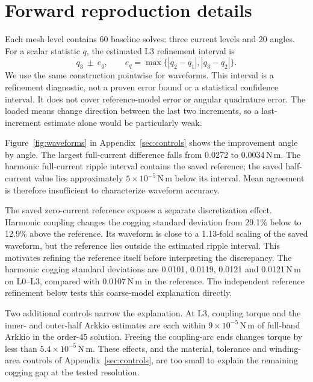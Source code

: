 \documentclass{anvil-paper}
\begin{document}
\section{Forward reproduction details}\label{sec:forward}
Each mesh
level contains 60 baseline solves: three current levels and 20 angles. For
a scalar statistic $q$, the estimated L3 refinement interval is
\begin{equation}
 q_3\ \pm\ e_q,\qquad
 e_q=\max\{|q_2-q_1|,|q_3-q_2|\}.
 \label{eq:band}
\end{equation}
We use the same construction pointwise for waveforms. This interval is a
refinement diagnostic, not a proven error bound or a statistical confidence
interval. It does not cover reference-model error or angular quadrature
error. The loaded means change direction between the last two increments,
so a last-increment estimate alone would be particularly weak.

Figure~\ref{fig:waveforms} in Appendix~\ref{sec:controls} shows the improvement angle by angle. The largest
full-current difference falls from 0.0272 to 0.0034\,N\,m. The harmonic
full-current ripple interval contains the saved reference; the saved half-current
value lies approximately $5\times10^{-5}$\,N\,m below its interval.
Mean agreement is therefore insufficient to characterize waveform accuracy.

The saved zero-current reference exposes a separate discretization effect. Harmonic coupling changes the
cogging standard deviation from 29.1\% below to 12.9\% above the reference.
Its waveform is close to a 1.13-fold scaling of the saved waveform, but the
reference lies outside the estimated ripple interval. This motivates
refining the reference itself before interpreting the discrepancy. The harmonic cogging standard deviations are
0.0101, 0.0119, 0.0121 and 0.0121\,N\,m on L0--L3, compared with
0.0107\,N\,m in the reference. The independent reference refinement below tests this coarse-model
explanation directly.

Two additional controls narrow the explanation. At L3, coupling torque
and the inner- and outer-half Arkkio estimates are each within
$9\times10^{-5}$\,N\,m of full-band Arkkio in the order-45 solution.
Freeing the coupling-arc ends changes torque by less than
$5.4\times10^{-5}$\,N\,m. These effects, and the material, tolerance and
winding-area controls of Appendix~\ref{sec:controls}, are too small to
explain the remaining cogging gap at the tested resolution.
\end{document}
